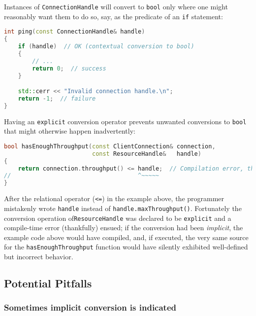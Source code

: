 \noindent Instances of \texttt{ConnectionHandle} will convert to \texttt{bool}
only where one might reasonably want them to do so, say, as the
predicate of an \texttt{if} statement:

\begin{lstlisting}[language=C++]
int ping(const ConnectionHandle& handle)
{
    if (handle)  // OK (contextual conversion to bool)
    {
        // ...
        return 0;  // success
    }

    std::cerr << "Invalid connection handle.\n";
    return -1;  // failure
}
\end{lstlisting}
    
\noindent Having an \texttt{explicit} conversion operator prevents unwanted
conversions to \texttt{bool} that might otherwise happen inadvertently:

\begin{lstlisting}[language=C++]
bool hasEnoughThroughput(const ClientConnection& connection,
                         const ResourceHandle&   handle)
{
    return connection.throughput() <= handle;  // Compilation error, thankfully
//                                    ^~~~~~
}
\end{lstlisting}
    
\noindent After the relational operator (\texttt{<=}) in the example above, the
programmer mistakenly wrote \texttt{handle} instead of
\mbox{\texttt{handle.maxThroughput()}}. Fortunately the conversion operation of\linebreak[4] %
\mbox{\texttt{ResourceHandle}} was declared to be \texttt{explicit} and a
compile-time error (thankfully) ensued; if the conversion had
been \emph{implicit}, the example code above would have compiled, and,
if executed, the very same source for the \mbox{\texttt{hasEnoughThroughput}}
function would have silently exhibited well-defined but incorrect
behavior.

\subsection[Potential Pitfalls]{Potential Pitfalls}\label{potential-pitfalls-explicitconv}

\subsubsection[Sometimes implicit conversion is indicated]{Sometimes implicit conversion is indicated}\label{sometimes-implicit-conversion-is-indicated}

